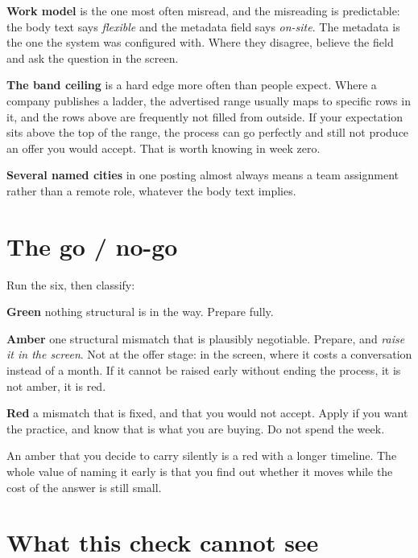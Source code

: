 \textbf{Work model} is the one most often misread, and the misreading is
predictable: the body text says \emph{flexible} and the metadata field says
\emph{on-site}. The metadata is the one the system was configured with. Where
they disagree, believe the field and ask the question in the screen.

\textbf{The band ceiling} is a hard edge more often than people expect. Where a
company publishes a ladder, the advertised range usually maps to specific rows
in it, and the rows above are frequently not filled from outside. If your
expectation sits above the top of the range, the process can go perfectly and
still not produce an offer you would accept. That is worth knowing in week
zero.

\textbf{Several named cities} in one posting almost always means a team
assignment rather than a remote role, whatever the body text implies.

\section{The go / no-go}

\begin{kitmethod}
Run the six, then classify:

\textbf{Green} \dash{} nothing structural is in the way. Prepare fully.

\textbf{Amber} \dash{} one structural mismatch that is plausibly negotiable.
Prepare, and \emph{raise it in the screen}. Not at the offer stage: in the
screen, where it costs a conversation instead of a month. If it cannot be
raised early without ending the process, it is not amber, it is red.

\textbf{Red} \dash{} a mismatch that is fixed, and that you would not accept.
Apply if you want the practice, and know that is what you are buying. Do not
spend the week.
\end{kitmethod}

\begin{kitnote}
An amber that you decide to carry silently is a red with a longer timeline. The
whole value of naming it early is that you find out whether it moves while the
cost of the answer is still small.
\end{kitnote}

\section{What this check cannot see}

